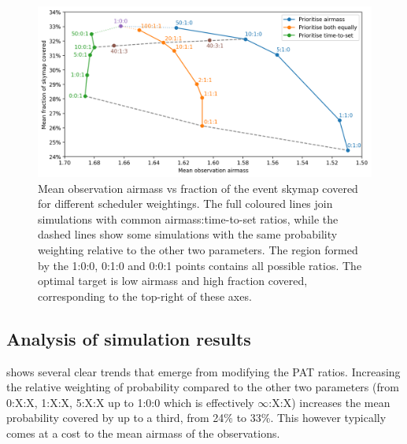 \begin{colsection}
\begin{colsection}
\begin{figure}[t]
    \begin{center}
        \includegraphics[width=\linewidth]{images/scheduler_sim.png}
    \end{center}
    \caption[Airmass vs fraction of skymap covered for different scheduler weightings]{
        Mean observation airmass vs fraction of the event skymap covered for different scheduler weightings. The full coloured lines join simulations with common airmass:time-to-set ratios, while the dashed lines show some simulations with the same probability weighting relative to the other two parameters. The region formed by the 1:0:0, 0:1:0 and 0:0:1 points contains all possible ratios. The optimal target is low airmass and high fraction covered, corresponding to the top-right of these axes.
    }\label{fig:scheduler_sim_results}
\end{figure}

\end{colsection}


\subsection{Analysis of simulation results}
\label{sec:scheduler_sim_analysis}
\begin{colsection}

 shows several clear trends that emerge from modifying the PAT ratios. Increasing the relative weighting of probability compared to the other two parameters (from 0:X:X, 1:X:X, 5:X:X up to 1:0:0 which is effectively $\infty$:X:X) increases the mean probability covered by up to a third, from 24\% to 33\%. This however typically comes at a cost to the mean airmass of the observations.


\end{colsection}
\end{colsection}
